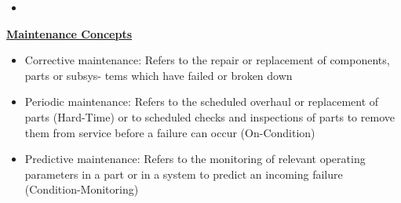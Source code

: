 \documentclass[9pt, landscape, fleqn]{scrartcl}
\begin{document}
\begin{multicols*}{3}
\begin{itemize}
\begin{itemize}
        \item 
    \end{itemize}
\end{itemize}
\underline{\textbf{Maintenance Concepts}}
\begin{itemize}
    \item Corrective maintenance: Refers to the repair or replacement of components, parts or subsys- tems which have failed or broken down
    \item Periodic maintenance: Refers to the scheduled overhaul or replacement of parts (Hard-Time) or to scheduled checks and inspections of parts to remove them from service before a failure can occur (On-Condition)
    \item Predictive maintenance: Refers to the monitoring of relevant operating parameters in a part or in a system to predict an incoming failure (Condition-Monitoring)
\end{itemize}
\newpage

\end{multicols*}
\end{document}
